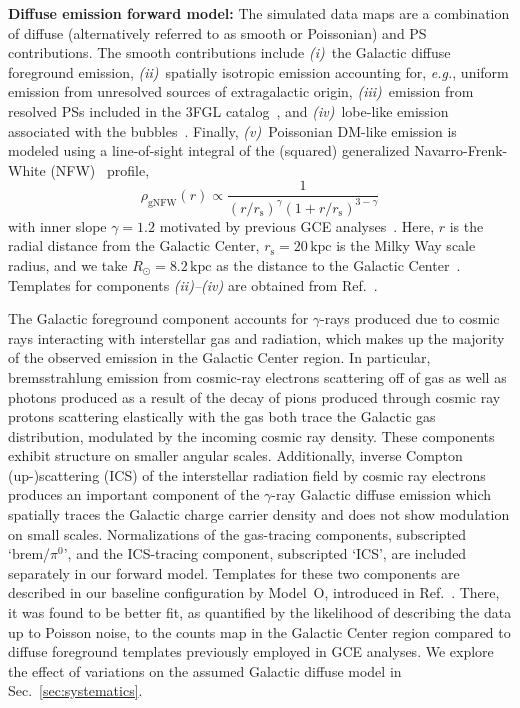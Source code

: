 \documentclass[prd,aps,10pt,nofootinbib,twocolumn,superscriptaddress,preprintnumbers,balancelastpage,longbibliography,floatfix]{revtex4-2}
\newcommand{\changes}[1]{{{\color{red}#1}}}
\begin{document}
\noindent
\textbf{Diffuse emission forward model:} The simulated data maps are a combination of diffuse (alternatively referred to as smooth or Poissonian) and PS contributions. The smooth contributions include \emph{(i)}~the Galactic diffuse foreground emission, \emph{(ii)}~spatially isotropic emission accounting for, \emph{e.g.}, uniform emission from unresolved sources of extragalactic origin, \emph{(iii)}~emission from resolved PSs included in the \Fermi 3FGL catalog~\cite{Fermi-LAT:2015bhf}, and \emph{(iv)}~lobe-like emission associated with the \Fermi bubbles~\cite{Su:2010qj}. Finally, \emph{(v)}~Poissonian DM-like emission is modeled using a line-of-sight integral of the (squared) generalized Navarro-Frenk-White (NFW)~\cite{Navarro:1995iw,Navarro:1996gj} profile,
\begin{equation}
\label{eq:nfw}
\rho_\mathrm{gNFW}(r) \propto \frac{1}{\left(r / r_{\mathrm s}\right)^{\gamma}\left(1+r / r_{\mathrm s}\right)^{3-\gamma}}
\end{equation}
with inner slope $\gamma=1.2$ motivated by previous GCE analyses~\cite{Gordon:2013vta,Daylan:2014rsa,Zhou:2014lva}. Here, $r$ is the radial distance from the Galactic Center, $r_{\mathrm s}=20\,\mathrm{kpc}$ is the Milky Way scale radius, and we take $R_\odot = 8.2\,\mathrm{kpc}$ as the distance to the Galactic Center~\cite{2020arXiv201202169B,2019A&A...625L..10G}. Templates for components \emph{(ii)--(iv)} are obtained from Ref.~\cite{Mishra-Sharma:2016gis}. 

The Galactic foreground component accounts for \changes{$\gamma$-rays} produced due to cosmic rays interacting with interstellar gas and radiation, which makes up the majority of the observed emission in the Galactic Center region. In particular, bremsstrahlung emission from cosmic-ray electrons scattering off of gas as well as photons produced as a result of the decay of pions produced through cosmic ray protons scattering elastically with the gas both trace the Galactic gas distribution, modulated by the incoming cosmic ray density. These components exhibit structure on smaller angular scales. Additionally, inverse Compton (up-)scattering (ICS) of the interstellar radiation field by cosmic ray electrons produces an important component of the $\gamma$-ray Galactic diffuse emission which spatially traces the Galactic charge carrier density and does not show modulation on small scales. Normalizations of the gas-tracing components, subscripted `brem/$\pi^0$', and the ICS-tracing component, subscripted `ICS', are included separately in our forward model. Templates for these two components are described in our baseline configuration by {Model~O}, introduced in Ref.~\cite{Buschmann:2020adf}. There, it was found to be better fit, as quantified by the likelihood of describing the data up to Poisson noise, to the counts map in the Galactic Center region compared to diffuse foreground templates previously employed in GCE analyses. We explore the effect of variations on the assumed Galactic diffuse model in Sec.~\ref{sec:systematics}. 
\end{document}
